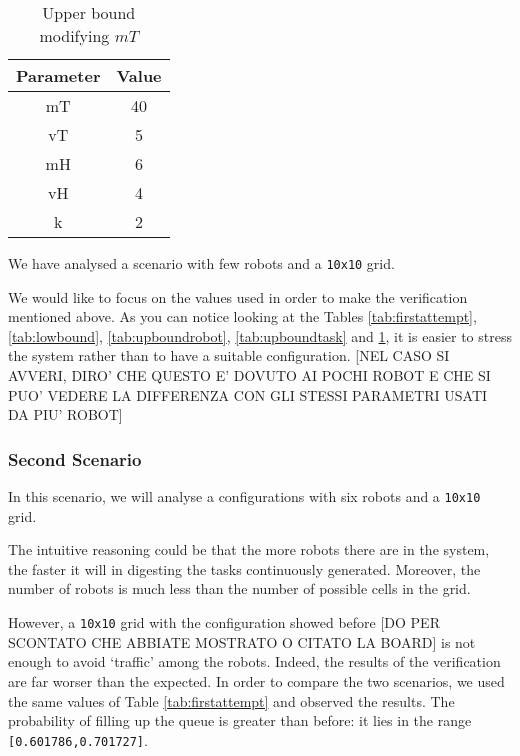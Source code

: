 \begin{table}[h]
    \centering
        \begin{tabular}{|c c|} 
            \hline
            Parameter & Value \\ [0.5ex] 
            \hline\hline
            mT & 40 \\
            vT & 5 \\
            mH & 6 \\
            vH & 4 \\
            k & 2 \\ [0.5ex] 
            \hline
        \end{tabular}
        \caption{Upper bound modifying $mT$}
        \label{tab:upboundhuman}
\end{table}

We have analysed a scenario with few robots and a \texttt{10x10} grid.

We would like to focus on the values used in order to make the verification mentioned above. As you can notice looking at the Tables \ref{tab:firstattempt}, \ref{tab:lowbound}, \ref{tab:upboundrobot}, \ref{tab:upboundtask} and \ref{tab:upboundhuman}, it is easier to stress the system rather than to have a suitable configuration. [NEL CASO SI AVVERI, DIRO' CHE QUESTO E' DOVUTO AI POCHI ROBOT E CHE SI PUO' VEDERE LA DIFFERENZA CON GLI STESSI PARAMETRI USATI DA PIU' ROBOT]

\subsubsection{Second Scenario}
In this scenario, we will analyse a configurations with six robots and a \texttt{10x10} grid.

The intuitive reasoning could be that the more robots there are in the system, the faster it will in digesting the tasks continuously generated. Moreover, the number of robots is much less than the number of possible cells in the grid.

However, a \texttt{10x10} grid with the configuration showed before [DO PER SCONTATO CHE ABBIATE MOSTRATO O CITATO LA BOARD] is not enough to avoid `traffic' among the robots. Indeed, the results of the verification are far worser than the expected. In order to compare the two scenarios, we used the same values of Table \ref{tab:firstattempt} and observed the results. The probability of filling up the queue is greater than before: it lies in the range \texttt{[0.601786,0.701727]}.

